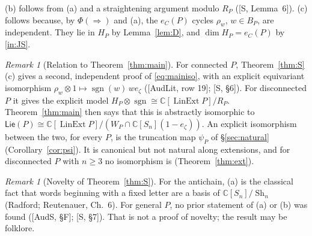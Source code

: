 \documentclass[11pt]{article}
\theoremstyle{definition}
\theoremstyle{remark}
\newtheorem{remark}[theorem]{Remark}
\newcommand{\Lin}{\operatorname{LinExt}}
\newcommand{\sgn}{\operatorname{sgn}}
\newcommand{\PLie}{\mathsf{Lie}}
\newcommand{\Sh}{\operatorname{Sh}}
\begin{document}
(b) follows from (a) and a straightening argument modulo $R_P$
([S, Lemma~6]). (c) follows because, by $\Phi(\Rightarrow)$ and (a), the
$e_C(P)$ cycles $\rho_w$, $w\in B_P$, are independent. They lie in $H_P$ by
Lemma~\ref{lem:D}, and $\dim H_P=e_C(P)$ by \ref{in:JS}.

\begin{remark}[Relation to Theorem~\ref{thm:main}]
For connected $P$, Theorem~\ref{thm:S}(c) gives a second, independent proof
of \eqref{eq:mainiso}, with an explicit equivariant isomorphism
$\rho_w\otimes1\mapsto\sgn(w)\,we_\zeta$ ([AudLit, row 19]; [S, \S6]). For
disconnected $P$ it gives the explicit model
$H_P\otimes\sgn\cong\mathbb C[\Lin P]/R_P$. Theorem~\ref{thm:main} then says
that this is abstractly isomorphic to
$\PLie(P)\cong\mathbb C[\Lin P]/(W_P\cap\mathbb C[S_n](1-e_\zeta))$. An
explicit isomorphism between the two, for every $P$, is the truncation map
$\psi_P$ of \S\ref{sec:natural} (Corollary~\ref{cor:psi}). It is
canonical but not natural along extensions, and for disconnected $P$ with
$n\ge3$ no isomorphism is (Theorem~\ref{thm:ext}).
\end{remark}

\begin{remark}[Novelty of Theorem~\ref{thm:S}]
For the antichain, (a) is the classical fact that words beginning with a
fixed letter are a basis of $\mathbb C[S_n]/\Sh_n$ (Radford; Reutenauer,
Ch.~6). For general $P$, no prior statement of (a) or (b) was found
([AudS, \S F]; [S, \S7]). That is not a proof of novelty; the result may be
folklore.
\end{remark}
\end{document}
